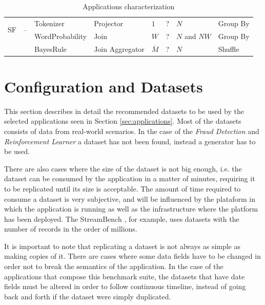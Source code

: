 \documentclass[ppgc,diss,english]{iiufrgs}
\begin{document}
\begin{table}[h]
\begin{center}
\begin{tabular}{ | l | p{2.5cm} | p{2.5cm} | p{2cm} | l | l | l | p{1.5cm} | }
    		\multirow{2}{*}{SF} & \multirow{2}{*}{\parbox[t]{2.5cm}{--}} & Tokenizer       & Projector       & $1$             & ? & $N$ & Group By \\\cline{3-8}
    					        &                                        & WordProbability & Join            & $W$             & ? & $N$ and $NW$ & Group By \\\cline{3-8}
    					        &                                        & BayesRule       & Join Aggregator & $\overline{M}$  & ? & $N$ & Shuffle \\\hline
    		
	\end{tabular}
	\caption{Applications characterization}
	\label{table:app_characteristics}
	
\end{center}
\end{table}




\section{Configuration and Datasets}
\label{sec:configuration_datasets}

This section describes in detail the recommended datasets to be used by the selected applications seen in Section \ref{sec:applications}. Most of the datasets consists of data from real-world scenarios. In the case of the \emph{Fraud Detection} and \emph{Reinforcement Learner} a dataset has not been found, instead a generator has to be used.

There are also cases where the size of the dataset is not big enough, i.e. the dataset can be consumed by the application in a matter of minutes, requiring it to be replicated until its size is acceptable. The amount of time required to consume a dataset is very subjective, and will be influenced by the plataform in which the application is running as well as the infrastructure where the platform has been deployed. The StreamBench \cite{lu2014stream}, for example, uses datasets with the number of records in the order of millions.

It is important to note that replicating a dataset is not always as simple as making copies of it. There are cases where some data fields have to be changed in order not to break the semantics of the application. In the case of the applications that compose this benchmark suite, the datasets that have date fields must be altered in order to follow continuous timeline, instead of going back and forth if the dataset were simply duplicated.
\end{document}
